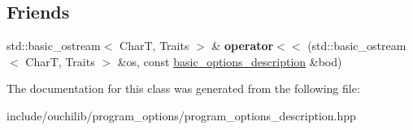 \subsection*{Friends}
\begin{DoxyCompactItemize}
\item 
\mbox{\label{classouchi_1_1program__options_1_1basic__options__description_a1c02b5775fffa8d123db3d8716a4bf31}} 
std\+::basic\+\_\+ostream$<$ CharT, Traits $>$ \& {\bfseries operator$<$$<$} (std\+::basic\+\_\+ostream$<$ CharT, Traits $>$ \&os, const \mbox{\hyperlink{classouchi_1_1program__options_1_1basic__options__description}{basic\+\_\+options\+\_\+description}} \&bod)
\end{DoxyCompactItemize}


The documentation for this class was generated from the following file\+:\begin{DoxyCompactItemize}
\item 
include/ouchilib/program\+\_\+options/program\+\_\+options\+\_\+description.\+hpp\end{DoxyCompactItemize}
